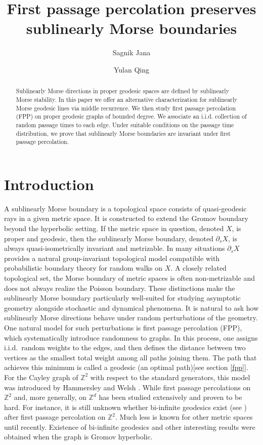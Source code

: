 \documentclass[12 pt]{amsart}
\title[First passage percolation preserves sublinearly Morse boundaries]{First passage percolation preserves sublinearly Morse boundaries}
\author{Sagnik Jana}
\author{Yulan Qing}
\theoremstyle{definition}
\theoremstyle{remark}
\newcommand{\ps}{{\partial_s}}
\begin{document}
\maketitle
\begin{abstract}
Sublinearly Morse directions in proper geodesic spaces are defined by sublinearly Morse stability. In this paper we offer an alternative  characterization for sublinearly Morse geodesic lines via middle recurrence. We then study first passage percolation (FPP) on proper geodesic graphs of bounded degree. We associate an i.i.d. collection of random passage times to each edge. Under suitable conditions on the passage time distribution,  we prove that sublinearly Morse boundaries are invariant under first passage percolation.
\end{abstract}

\section{Introduction}
 A sublinearly Morse boundary \cite{QRT1,QRT2} is a topological space consists of quasi-geodesic rays in a given metric space. It is constructed to extend the Gromov boundary beyond the hyperbolic setting. If the metric space in question, denoted $X$, is proper and geodesic, then the sublinearly Morse boundary, denoted $\ps X$,  is always quasi-isometrically invariant and metrizable. In many situations $\ps X$ provides a natural group-invariant topological model compatible with probabilistic boundary theory for random walks on $X$. A closely related topological set, the Morse boundary \cite{Cordes,CS} of metric spaces is often non-metrizable and does not always realize the Poisson boundary. These distinctions make the sublinearly Morse boundary particularly well-suited for studying asymptotic geometry alongside stochastic and dynamical phenomena. It is natural to ask how sublinearly Morse directions behave under random perturbations of the geometry. One natural model for such perturbations is first passage percolation (FPP), which systematically introduce randomness to graphs. In this process, one assigns i.i.d.\ random weights to the edges, and then defines the distance between two vertices as the smallest total weight among all paths joining them. The path that achieves this minimum is called a geodesic (an optimal path)[see section \ref{fpp}]. For the Cayley graph of $\mathbb{Z}^2$ with respect to the standard generators, this model was introduced by Hammersley and Welsh \cite{HW65}. While first passage percolations on $\mathbb{Z}^2$ and, more generally, on $\mathbb{Z}^d$ has been studied extensively and proven to be hard. For instance, it is still unknown whether bi-infinite geodesics exist (see \cite{Kesten}) after first passage percolation on $\mathbb{Z}^2$. Much less is known for other metric spaces until recently. Existence of bi-infinite geodesics and other interesting results \cite{BZ12,BT17} were obtained when the graph is Gromov hyperbolic.
 
\end{document}
